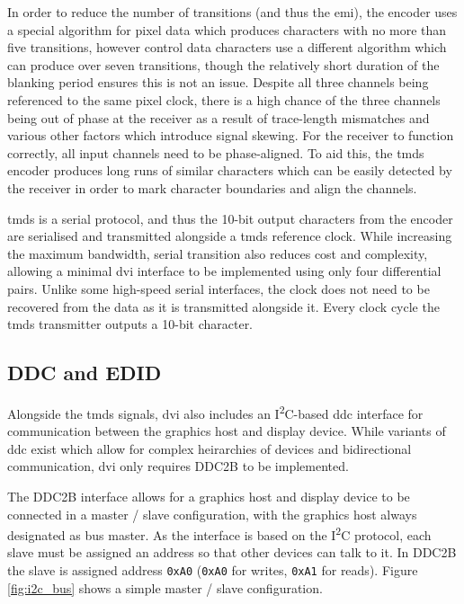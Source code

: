 In order to reduce the number of transitions (and thus the \gls{emi}), the encoder uses a special algorithm for pixel data which produces characters with no more than five transitions, however control data characters use a different algorithm which can produce over seven transitions, though the relatively short duration of the blanking period ensures this is not an issue. Despite all three channels being referenced to the same pixel clock, there is a high chance of the three channels being out of phase at the receiver as a result of trace-length mismatches and various other factors which introduce signal skewing. For the receiver to function correctly, all input channels need to be phase-aligned. To aid this, the \gls{tmds} encoder produces long runs of similar characters which can be easily detected by the receiver in order to mark character boundaries and align the channels.

\gls{tmds} is a serial protocol, and thus the 10-bit output characters from the encoder are serialised and transmitted alongside a \gls{tmds} reference clock. While increasing the maximum bandwidth, serial transition also reduces cost and complexity, allowing a minimal \gls{dvi} interface to be implemented using only four differential pairs. Unlike some high-speed serial interfaces, the clock does not need to be recovered from the data as it is transmitted alongside it. Every clock cycle the \gls{tmds} transmitter outputs a 10-bit character.

\subsection{DDC and EDID}

Alongside the \gls{tmds} signals, \gls{dvi} also includes an I\textsuperscript{2}C-based \gls{ddc} interface for communication between the graphics host and display device. While variants of \gls{ddc} exist which allow for complex heirarchies of devices and bidirectional communication, \gls{dvi} only requires DDC2B to be implemented.

The DDC2B interface allows for a graphics host and display device to be connected in a master / slave configuration, with the graphics host always designated as bus master. As the interface is based on the I\textsuperscript{2}C protocol, each slave must be assigned an address so that other devices can talk to it. In DDC2B the slave is assigned address \texttt{0xA0} (\texttt{0xA0} for writes, \texttt{0xA1} for reads). Figure \ref{fig:i2c_bus} shows a simple master / slave configuration.

